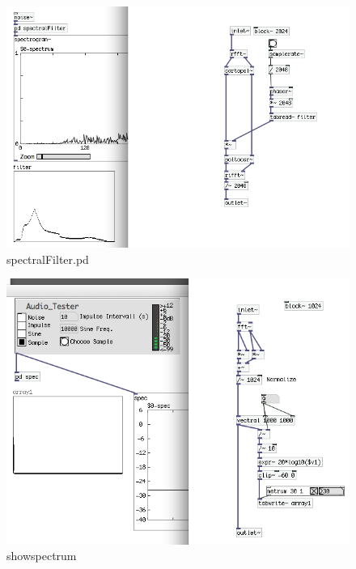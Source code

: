 \begin{figure}[h]
	\begin{center}
		\includegraphics[width = 14cm]{img/spectralFilter.png}
		\caption{spectralFilter.pd}
		\label{fig:spectralFilter}
	\end{center}
\end{figure}

\begin{figure}[h]
	\begin{center}
		\includegraphics[width = 14cm]{img/showspectrum.png}
		\caption{showspectrum}
		\label{fig:showspectrum}
	\end{center}
\end{figure}
